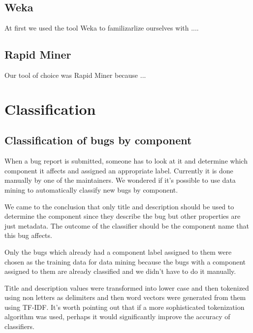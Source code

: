 \subsection{Weka} %
\label{sub:Weka}

At first we used the tool Weka to familizarlize ourselves with ....


\subsection{Rapid Miner} %
\label{sub:Rapid Miner}

Our tool of choice was Rapid Miner because ...



\section{Classification} %
\label{sub:Classification}

\subsection{Classification of bugs by component} %
\label{sub:Classification of bugs bugs by component}

When a bug report is submitted, someone has to look at it and determine which component it affects and assigned an appropriate label. Currently it is done manually by one of the maintainers. We wondered if it's possible to use data mining to automatically classify new bugs by component.

We came to the conclusion that only title and description should be used to determine the component since they describe the bug but other properties are just metadata. The outcome of the classifier should be the component name that this bug affects.

Only the bugs which already had a component label assigned to them were chosen as the training data for data mining because the bugs with a component assigned to them are already classified and we didn't have to do it manually.

Title and description values were transformed into lower case and then tokenized using non letters as delimiters and then word vectors were generated from them using TF-IDF. It's worth pointing out that if a more sophisticated tokenization algorithm was used, perhaps it would significantly improve the accuracy of classifiers.

